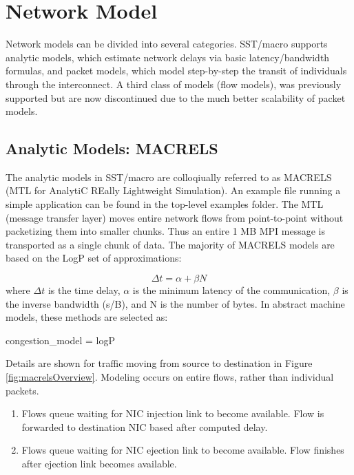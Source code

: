 
\section{Network Model}
\label{sec:tutorial:networkmodel}

Network models can be divided into several categories.  SST/macro supports analytic models, which estimate network delays via basic latency/bandwidth formulas, and packet models, which model step-by-step the transit of individuals through the interconnect.
A third class of models (flow models), was previously supported but are now discontinued due to the much better scalability of packet models.

\subsection{Analytic Models: MACRELS}
\label{subsec:tutorial:macrels}

The analytic models in SST/macro are colloqiually referred to as MACRELS (MTL for AnalytiC REally Lightweight Simulation).
An example file running a simple application can be found in the top-level examples folder.
The MTL (message transfer layer) moves entire network flows from point-to-point without packetizing them into smaller chunks.
Thus an entire 1 MB MPI message is transported as a single chunk of data.  
The majority of MACRELS models are based on the LogP set of approximations:

\[
\Delta t = \alpha + \beta N
\]
where $\Delta t$ is the time delay, $\alpha$ is the minimum latency of the communication, $\beta$ is the inverse bandwidth (s/B), and N is the number of bytes.
In abstract machine models, these methods are selected as:

\begin{ViFile}
congestion_model = logP
\end{ViFile}
Details are shown for traffic moving from source to destination in Figure \ref{fig:macrelsOverview}.
Modeling occurs on entire flows, rather than individual packets. 

\begin{enumerate}
\item Flows queue waiting for NIC injection link to become available. Flow is forwarded to destination NIC based after computed delay. 
\item Flows queue waiting for NIC ejection link to become available. Flow finishes after ejection link becomes available.
\end{enumerate}

